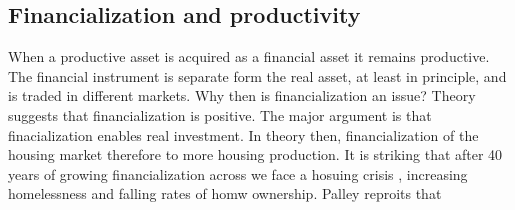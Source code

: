 %
%

\subsection{Financialization and productivity}
When  a productive asset is acquired as a financial asset it remains productive.  The financial instrument is separate form the real asset, at least in principle, and is traded in different markets. Why then is financialization an issue?  Theory suggests that financialization is positive.  The major argument is that finacialization enables real investment. In theory then, financialization of the housing market therefore  to more housing production. It is striking that after 40 years of growing financialization across we face a hosuing crisis , increasing homelessness and falling rates of homw ownership.  Palley \cite{palleyFinancializationWhatIt2007} reproits that 

